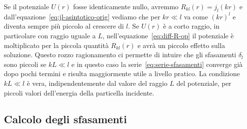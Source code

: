 \documentclass[a4paper,fleqn,twoside,12pt]{article}
\begin{document}
Se il potenziale $U(r)$ fosse identicamente nullo, avremmo
$R_{kl}(r) = j_{l}(kr)$ e dall'equazione~\eqref{eq:jl-asintotico-orig} vediamo
che per $kr \ll l$ va come $(kr)^{l}$ e diventa sempre più piccolo al crescere
di $l$.  Se $U(r)$ è a corto raggio, in particolare con raggio uguale a $L$,
nell'equazione~\eqref{eq:diff-R-op} il potenziale è moltiplicato per la piccola
quantità $R_{kl}(r)$ e avrà un piccolo effetto sulla soluzione.  Questo rozzo
ragionamento ci permette di intuire che gli sfasamenti $\delta_{l}$ sono piccoli
se $kL \ll l$ e in questo caso la serie~\eqref{eq:serie-sfasamenti} converge già
dopo pochi termini e risulta maggiormente utile a livello pratico.  La
condizione $kL \ll l$ è vera, indipendentemente dal valore del raggio $L$ del
potenziale, per piccoli valori dell'energia della particella incidente.


\subsection{Calcolo degli sfasamenti}
\label{sec:calcolo-sfasamenti}
\end{document}

